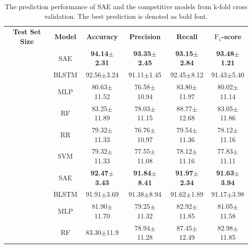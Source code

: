 \begin{table}[h]
    \setlength{\tabcolsep}{4pt} %
    \centering
    \caption{The prediction performance of SAE and the competitive models from k-fold cross validation. The best prediction is denoted as bold font.}\label{tab: experimetal results}
    \begin{tabular}{|c|c|c|c|c|c|} %
    \hline
    {\bfseries Test Set Size} & {\bfseries Model} & \multicolumn{1}{c}{{\bfseries Accuracy}} & \multicolumn{1}{c}{{\bfseries Precision}} & \multicolumn{1}{c}{{\bfseries Recall}} & {\bfseries $\text{F}_1$-score}\\ %
    \Xhline{1pt}
    \multirow{6}{*}{20\%} %
    & SAE & \multicolumn{1}{c}{{\bfseries 94.14$\pm$2.31}} & \multicolumn{1}{c}{\bfseries{93.35$\pm$2.45}} & \multicolumn{1}{c}{{\bfseries 93.15$\pm$2.84}} & {\bfseries 93.48$\pm$1.21}\\
    & BLSTM & \multicolumn{1}{c}{92.56$\pm$3.24} & \multicolumn{1}{c}{91.11$\pm$1.45} & \multicolumn{1}{c}{92.45$\pm$8.12} & 91.43$\pm$5.40\\
    & MLP & \multicolumn{1}{c}{80.63$\pm$11.52} & \multicolumn{1}{c}{76.58$\pm$10.94} & \multicolumn{1}{c}{83.80$\pm$11.97} & 80.02$\pm$11.14\\
    & RF & \multicolumn{1}{c}{83.25$\pm$11.89} & \multicolumn{1}{c}{78.03$\pm$11.15} & \multicolumn{1}{c}{88.77$\pm$12.68} & 83.05$\pm$11.86\\
    & RR & \multicolumn{1}{c}{79.32$\pm$11.33} & \multicolumn{1}{c}{76.76$\pm$10.97} & \multicolumn{1}{c}{79.54$\pm$11.36} & 78.12$\pm$11.16\\
    & SVM & \multicolumn{1}{c}{79.32$\pm$11.33} & \multicolumn{1}{c}{77.55$\pm$11.08} & \multicolumn{1}{c}{78.12$\pm$11.16} & 77.83$\pm$11.11\\
    \Xhline{1pt}
    \multirow{6}{*}{25\%} %
    & SAE & \multicolumn{1}{c}{{\bfseries 92.47$\pm$3.43}} & \multicolumn{1}{c}{{\bfseries 91.84$\pm$8.41}} & \multicolumn{1}{c}{{\bfseries 91.97$\pm$2.34}} & {\bfseries 91.63$\pm$3.94}\\
    & BLSTM & \multicolumn{1}{c}{91.91$\pm$3.69} & \multicolumn{1}{c}{91.38$\pm$8.94} & \multicolumn{1}{c}{91.62$\pm$1.89} & 91.17$\pm$3.98\\
    & MLP & \multicolumn{1}{c}{81.90$\pm$11.70} & \multicolumn{1}{c}{79.25$\pm$11.32} & \multicolumn{1}{c}{82.92$\pm$11.85} & 81.05$\pm$11.58\\
    & RF & \multicolumn{1}{c}{83.30$\pm$11.9} & \multicolumn{1}{c}{78.94$\pm$11.28} & \multicolumn{1}{c}{87.45$\pm$12.49} & 82.98$\pm$11.85\\

\end{tabular}
\end{table}
